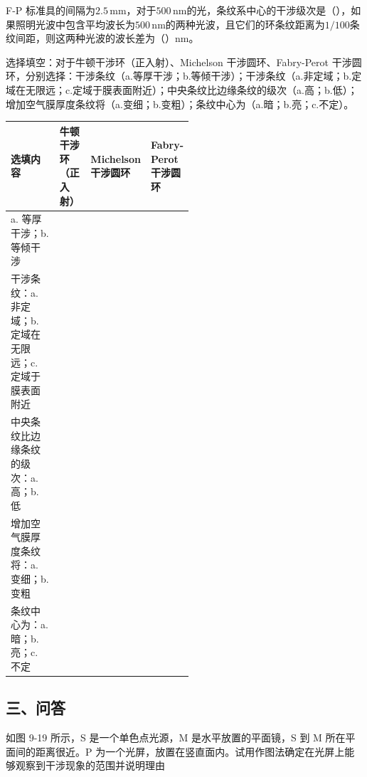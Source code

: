 \documentclass[padl, analysis, notocnum]{ExBook}
\newcommand{\answerarea}[1][3.5cm]{%
  \par\vspace{1mm}%
  \noindent{\color{themeColor!35}\rule{\linewidth}{0.4pt}}\par
  \noindent\begin{minipage}[t][#1][t]{\linewidth}\vspace{0pt}\end{minipage}\par
  \noindent{\color{themeColor!35}\rule{\linewidth}{0.4pt}}\par
}
\begin{document}
\begin{qitems}[startnum=22]
\qitem F-P 标准具的间隔为$2.5\,\mathrm{mm}$，对于$500\,\mathrm{nm}$的光，条纹系中心的干涉级次是（\hspace{1.6em}），如果照明光波中包含平均波长为$500\,\mathrm{nm}$的两种光波，且它们的环条纹距离为$1/100$条纹间距，则这两种光波的波长差为（\hspace{1.6em}）nm。
\label{q:245:start}
\answerarea[1.6cm]
\label{q:245:end}
\end{qitems}

\begin{qitems}[startnum=23]
\qitem 选择填空：对于牛顿干涉环（正入射）、Michelson 干涉圆环、Fabry-Perot 干涉圆环，分别选择：干涉条纹（a.等厚干涉；b.等倾干涉）；干涉条纹（a.非定域；b.定域在无限远；c.定域于膜表面附近）；中央条纹比边缘条纹的级次（a.高；b.低）；增加空气膜厚度条纹将（a.变细；b.变粗）；条纹中心为（a.暗；b.亮；c.不定）。
{\small

\par\vspace{2mm}
\noindent\begin{tabularx}{\linewidth}{|>{\raggedright\arraybackslash}X|>{\centering\arraybackslash}p{0.17\linewidth}|>{\centering\arraybackslash}p{0.17\linewidth}|>{\centering\arraybackslash}p{0.17\linewidth}|}
\hline
选填内容 & 牛顿干涉环（正入射） & Michelson 干涉圆环 & Fabry-Perot 干涉圆环 \\
\hline
a. 等厚干涉；b. 等倾干涉 & & & \\
\hline
干涉条纹：a. 非定域；b. 定域在无限远；c. 定域于膜表面附近 & & & \\
\hline
中央条纹比边缘条纹的级次：a. 高；b. 低 & & & \\
\hline
增加空气膜厚度条纹将：a. 变细；b. 变粗 & & & \\
\hline
条纹中心为：a. 暗；b. 亮；c. 不定 & & & \\
\hline
\end{tabularx}

}
\label{q:246:start}
\answerarea[1.2cm]
\label{q:246:end}
\end{qitems}

\subsection{三、问答}
\begin{qitems}[unshow,suffix={}]
\qitem 如图 9-19 所示，S 是一个单色点光源，M 是水平放置的平面镜，S 到 M 所在平面间的距离很近。P 为一个光屏，放置在竖直面内。试用作图法确定在光屏上能够观察到干涉现象的范围并说明理由
\label{q:247:start}
\answerarea[2.4cm]
\label{q:247:end}
\end{qitems}
\end{document}
